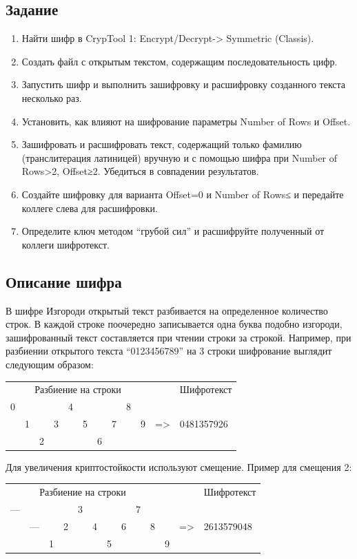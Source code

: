 \documentclass[a4paper, 14pt]{extarticle}
\begin{document}
\subsection{Задание}
\begin{enumerate}
    \item Найти шифр в CrypTool 1: Encrypt/Decrypt-> Symmetric (Classis).
    \item Создать файл с открытым текстом, содержащим последовательность цифр.
    \item Запустить шифр и выполнить зашифровку и расшифровку созданного текста несколько раз.
    \item Установить, как влияют на шифрование параметры Number of Rows и Offset.
    \item Зашифровать и расшифровать текст, содержащий только фамилию (транслитерация латиницей) вручную и с помощью шифра при Number of Rows>2, Offset≥2. Убедиться в совпадении результатов.
    \item Создайте шифровку для варианта Offset=0 и Number of Rows≤ и передайте коллеге слева для расшифровки.
    \item Определите ключ методом ``грубой сил'' и расшифруйте полученный от коллеги шифротекст.
\end{enumerate}
\subsection{Описание шифра}
В шифре Изгороди открытый текст разбивается на определенное количество строк. В каждой строке поочередно записывается одна буква подобно изгороди, зашифрованный текст составляется при чтении строки за строкой. Например, при разбиении открытого текста ``0123456789'' на 3 строки шифрование выглядит следующим образом:

\begin{tabularx}{0.8\textwidth}{XXXXXXXXXXXX}
\multicolumn{10}{c}{Разбиение на строки} &  & Шифротекст \\
0 &  &  &  & 4 &  &  &  & 8 &  &  &  \\
 & 1 &  & 3 &  & 5 &  & 7 &  & 9 & =\textgreater{} & 0481357926 \\
 &  & 2 &  &  &  & 6 &  &  &  &  & 
\end{tabularx}

Для увеличения криптостойкости используют смещение. Пример для смещения 2:

\begin{tabularx}{0.8\textwidth}{XXXXXXXXXXXXX}
\multicolumn{10}{c}{Разбиение на строки} &  &  & Шифротекст \\
--- &  &  &  & 3 &  &  &  & 7 &  &  &  &  \\
 & --- &  & 2 &  & 4 &  & 6 &  & 8 &  & =\textgreater{} & 2613579048 \\
 &  & 1 &  &  &  & 5 &  &  &  & 9 &  & 
\end{tabularx}
\end{document}
